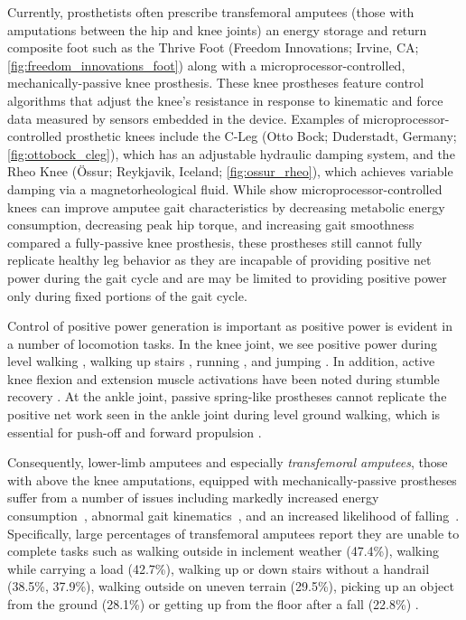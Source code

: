 Currently, prosthetists often prescribe transfemoral amputees (those with
amputations between the hip and knee joints) an energy storage and return
composite foot such as the Thrive Foot (Freedom Innovations; Irvine, CA;\@
\cref{fig:freedom_innovations_foot}) along with a microprocessor-controlled,
mechanically-passive knee prosthesis. These knee prostheses feature control
algorithms that adjust the knee's resistance in response to kinematic and force
data measured by sensors embedded in the device. Examples of
microprocessor-controlled prosthetic knees include the C-Leg (Otto Bock;
Duderstadt, Germany; \cref{fig:ottobock_cleg}), which has an adjustable
hydraulic damping system, and the Rheo Knee (Össur; Reykjavik, Iceland;
\cref{fig:ossur_rheo}), which achieves variable damping via a magnetorheological
fluid. While \citet{johansson2005clinical} show microprocessor-controlled knees
can improve amputee gait characteristics by decreasing metabolic energy
consumption, decreasing peak hip torque, and increasing gait smoothness compared
a fully-passive knee prosthesis, these prostheses still cannot fully replicate
healthy leg behavior as they are incapable of providing positive net power
during the gait cycle and are may be limited to providing positive power only
during fixed portions of the gait cycle.

Control of positive power generation is important as positive power is evident
in a number of locomotion tasks. In the knee joint, we see positive power during
level walking \citep{perry2010gait}, walking up stairs
\citep{nadeau2003frontal}, running \citep{buczek1990stance}, and jumping
\citep{hubley1983work}. In addition, active knee flexion and extension muscle
activations have been noted during stumble recovery \citep{eng1994strategies}.
At the ankle joint, passive spring-like prostheses cannot replicate the positive
net work seen in the ankle joint during level ground walking, which is essential
for push-off and forward propulsion \citep{perry2010gait}.

Consequently, lower-limb amputees and especially \emph{transfemoral amputees},
those with above the knee amputations, equipped with mechanically-passive
prostheses suffer from a number of issues including markedly increased energy
consumption~\citep{waters1976energy}, abnormal gait
kinematics~\citep{jaegers1995prosthetic}, and an increased likelihood of
falling~\citep{miller2001prevalence}. Specifically, large percentages of
transfemoral amputees report they are unable to complete tasks such as walking
outside in inclement weather (47.4\%), walking while carrying a load (42.7\%),
walking up or down stairs without a handrail (38.5\%, 37.9\%), walking outside
on uneven terrain (29.5\%), picking up an object from the ground (28.1\%) or
getting up from the floor after a fall (22.8\%) \citep{gauthier1999enabling}.

